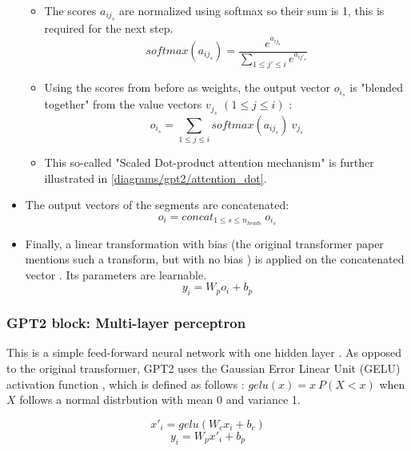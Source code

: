 \begin{itemize}
\begin{samepage}
\begin{itemize}
\item The scores $a_{ij_s}$ are normalized using softmax so their sum is 1, this is required for the next step.
   $$ softmax(a_{ij_s}) = \frac {e^{a_{ij_s}}} {\sum_{1 \leq j' \leq i} {e^{a_{ij'_s}}}} $$


\item Using the scores from before as weights, the output vector $o_{i_s}$ is "blended together" from the value vectors $v_{j_s}$ $(1 \leq j \leq i)$ \cite{alammar-gpt2}:
    $$o_{i_s} = \sum _{1 \leq j \leq i} softmax(a_{ij_s}) \ v_{j_s}$$

\item This so-called "Scaled Dot-product attention mechanism" is further illustrated in \cref{diagrams/gpt2/attention_dot}.

\end{itemize}
\end{samepage}


\item The output vectors of the segments are concatenated:
   $$o_i = concat _{1 \leq s \leq n_{heads}} \ o_{i_s}$$



\item Finally, a linear transformation with bias (the original transformer paper mentions such a transform, but with no bias ) is applied on the concatenated vector \cite{alammar-gpt2}. Its parameters are learnable.
   $$y_i = W_p o_i + b_p$$

\end{itemize}

\subsubsection{GPT2 block: Multi-layer perceptron}


This is a simple feed-forward neural network with one hidden layer \cite[p. 5]{allyouneed}.
As opposed to the original transformer, GPT2 uses the Gaussian Error Linear Unit (GELU) activation function , which is defined as follows \cite{gelu}: $gelu(x) = x \ P(X<x)$ when $X$ follows a normal distrbution with mean 0 and variance 1.

$$x'_i = gelu(W_c x_i + b_c)$$
$$y_i = W_p x'_i + b_p$$

